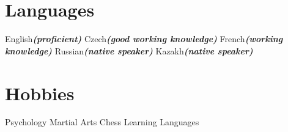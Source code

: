 \documentclass[]{deedy-resume-openfont}
\begin{document}
\begin{minipage}[t]{0.66\textwidth}

\section{Languages}

English{\footnotesize \textit{\textbf{(proficient) }}} \textbullet{}  Czech{\footnotesize \textit{\textbf{(good working knowledge) }}}\textbullet{} 
French{\footnotesize \textit{\textbf{(working knowledge) }}}\textbullet{}
Russian{\footnotesize \textit{\textbf{(native speaker) }}}\textbullet{}
Kazakh{\footnotesize \textit{\textbf{(native speaker) }}}\textbullet{} 
\sectionsep

\section{Hobbies}
Psychology\textbullet{}  Martial Arts\textbullet{} Chess\textbullet{} Learning Languages\textbullet{}\\
\sectionsep

\end{minipage} 
\end{document}
